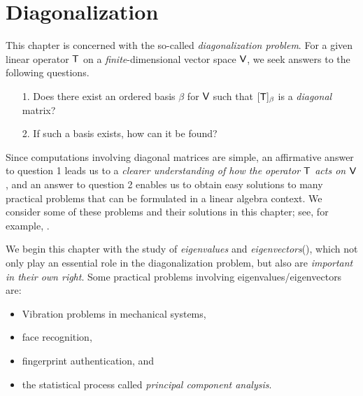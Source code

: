 \chapter{Diagonalization} \label{ch 5}

This chapter is concerned with the so-called \emph{diagonalization problem}.
For a given linear operator \(\textsf{T}\) on a \emph{finite}-dimensional vector space \(\textsf{V}\), we seek answers to the following questions.
\begin{enumerate}
\item[1.] Does there exist an ordered basis \(\beta\) for \(\textsf{V}\) such that \([\textsf{T}]_{\beta}\) is a \emph{diagonal} matrix?
\item[2.] If such a basis exists, how can it be found?
\end{enumerate}

Since computations involving diagonal matrices are simple, an affirmative answer to question 1 leads us to a \emph{clearer understanding of how the operator \(\textsf{T}\) acts on \(\textsf{V}\)},
and an answer to question 2 enables us to obtain easy solutions to many practical problems that can be formulated in a linear algebra context.
We consider some of these problems and their solutions in this chapter;
see, for example, .

We begin this chapter with the study of \emph{eigenvalues} and \emph{eigenvectors}(), which not only play an essential role in the diagonalization problem, but also are \emph{important in their own right}.
Some practical problems involving eigenvalues/eigenvectors are:
\begin{itemize}
    \item Vibration problems in mechanical systems,
    \item face recognition,
    \item fingerprint authentication, and
    \item the statistical process called \emph{principal component analysis}.
\end{itemize}







